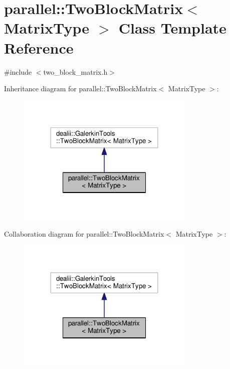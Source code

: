 \hypertarget{classparallel_1_1_two_block_matrix}{}\section{parallel\+:\+:Two\+Block\+Matrix$<$ Matrix\+Type $>$ Class Template Reference}
\label{classparallel_1_1_two_block_matrix}


{\ttfamily \#include $<$two\+\_\+block\+\_\+matrix.\+h$>$}



Inheritance diagram for parallel\+:\+:Two\+Block\+Matrix$<$ Matrix\+Type $>$\+:\nopagebreak
\begin{figure}[H]
\begin{center}
\leavevmode
\includegraphics[width=240pt]{classparallel_1_1_two_block_matrix__inherit__graph}
\end{center}
\end{figure}


Collaboration diagram for parallel\+:\+:Two\+Block\+Matrix$<$ Matrix\+Type $>$\+:\nopagebreak
\begin{figure}[H]
\begin{center}
\leavevmode
\includegraphics[width=240pt]{classparallel_1_1_two_block_matrix__coll__graph}
\end{center}
\end{figure}
